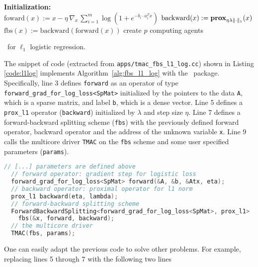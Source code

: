 \begin{algorithm}[H]\label{alg:fbs_l1_log}
\DontPrintSemicolon
  \textbf{Initialization:} \\
  \quad $\text{foward}(x) := x - \eta \, \nabla_x \,\sum_{i = 1}^m \log (1 + e^{-b_i \cdot a_i^T x})$  
  \quad $\text{backward}(x) := \mathbf{prox}_{\eta \lambda  \|\cdot\|_1} (x)$ 
  \quad $\text{fbs}(x) := \text{backward}(\text{forward}(x))$ 
  \quad create $p$ computing agents \\
  \caption{\pkg~for $\ell_1$ logistic regression.}
\end{algorithm}
The snippet of code (extracted from
\texttt{apps/tmac\_fbs\_l1\_log.cc}) shown in Listing \ref{code:l1log} implements Algorithm~\ref{alg:fbs_l1_log} with the \pkg~package.
Specifically, line 3 defines \texttt{forward} as an operator of type \texttt{forward\_grad\_for\_log\_loss<SpMat>}
initialized by the pointers to the data \texttt{A}, which is a sparse matrix, and label \texttt{b}, which is a dense vector. Line 5  defines a
\texttt{prox\_l1} operator (\texttt{backward}) initialized by $\lambda$ and step size $\eta$.
Line 7 defines a forward-backward splitting scheme (\texttt{fbs}) with the previously defined forward operator,
backward operator and the address of the unknown variable \texttt{x}. Line 9 calls the multicore driver
\texttt{TMAC} on the \texttt{fbs} scheme and some user specified parameters (\texttt{params}).
\begin{lstlisting}[caption={example code},label=code:l1log,language=C++]
  // [...] parameters are defined above
  // forward operator: gradient step for logistic loss
  forward_grad_for_log_loss<SpMat> forward(&A, &b, &Atx, eta);
  // backward operator: proximal operator for l1 norm
  prox_l1 backward(eta, lambda);
  // forward-backward splitting scheme
  ForwardBackwardSplitting<forward_grad_for_log_loss<SpMat>, prox_l1>
    fbs(&x, forward, backward);
  // the multicore driver
  TMAC(fbs, params);
\end{lstlisting}
One can easily adapt the previous code to solve other problems. For example, replacing lines 5 through 7 with
the following two lines

